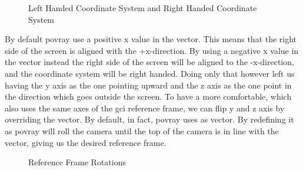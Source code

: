 \begin{figure}[htbp]
  \centering
  \qquad
  \caption{Left Handed Coordinate System and Right Handed Coordinate System}
  \label{fig:frames}
\end{figure}

By default \acrshort{povray} use a positive x value in the  vector. This means that the right side of the screen is aligned with the +x-direction. By using a negative x value in the  vector instead the right side of the screen will be aligned to the -x-direction, and the coordinate system will be right handed.
Doing only that however left us having the y axis as the one pointing upward and the z axis as the one point in the direction which goes outside the screen.
To have a more comfortable, which also uses the same axes of the \acrshort{gci} reference frame, we can flip y and z axis by overriding the  vector.
By default, in fact, \acrshort{povray} uses  as  vector. By redefining it as   \acrshort{povray} will roll the camera until the top of the camera is in line with the  vector, giving us the desired reference frame.

\begin{figure}[htbp]
  \centering
  \qquad
  \qquad
  \caption{Reference Frame Rotations}
  \label{fig:framesComparison}
\end{figure}


